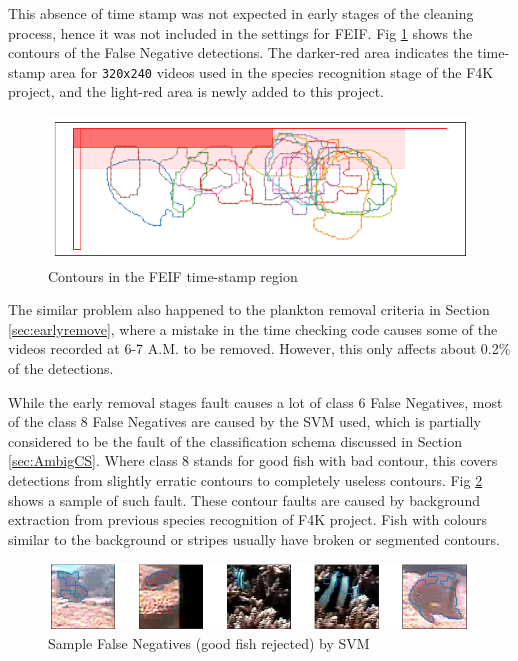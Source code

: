 \documentclass[bsc,logo,twoside,fullspacing,parskip]{infthesis}
\begin{document}
This absence of time stamp was not expected in early stages of the cleaning process, hence it was not included in the settings for FEIF. 
Fig \ref{fig:feiffail2} shows the contours of the False Negative detections.
The darker-red area indicates the time-stamp area for {\tt 320x240} videos used in the species recognition stage of the F4K project, and the light-red area is newly added to this project.

\begin{figure}[h]
    \centering
    \includegraphics[scale=0.30]{graph/feiffail.png}
    \caption{Contours in the FEIF time-stamp region}
    \label{fig:feiffail2}
\end{figure}

The similar problem also happened to the plankton removal criteria in Section \ref{sec:earlyremove}, where a mistake in the time checking code causes some of the videos recorded at 6-7 A.M. to be removed. 
However, this only affects about 0.2\% of the detections.

While the early removal stages fault causes a lot of class 6 False Negatives, most of the class 8 False Negatives are caused by the SVM used, which is partially considered to be the fault of the classification schema discussed in Section \ref{sec:AmbigCS}.
Where class 8 stands for good fish with bad contour, this covers detections from slightly erratic contours to completely useless contours.
Fig \ref{fig:SVMfail} shows a sample of such fault. 
These contour faults are caused by background extraction from previous species recognition of F4K project.
Fish with colours similar to the background or stripes usually have broken or segmented contours.

\begin{figure}[h]
    \centering
    \includegraphics[scale=0.40]{graph/SVMfail.png}
    \caption{Sample False Negatives (good fish rejected) by SVM}
    \label{fig:SVMfail}
\end{figure}
\end{document}
